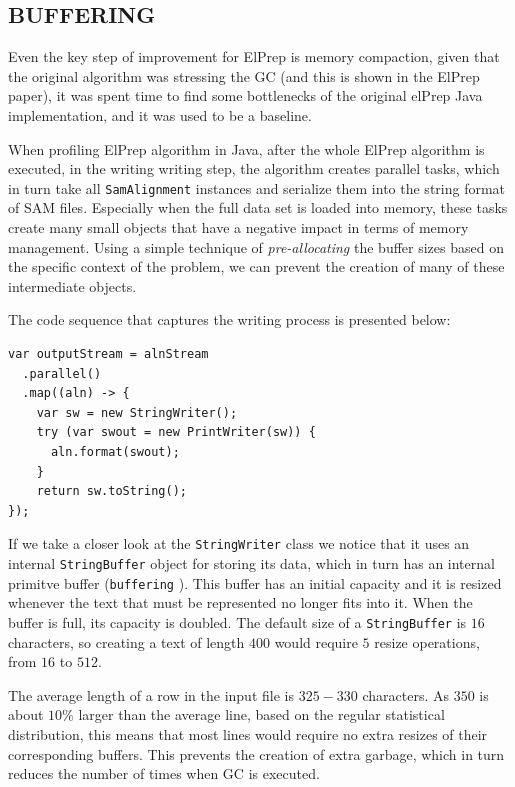 \documentclass[a4paper,twoside]{article}
\begin{document}
\subsection{\uppercase{Buffering}}
\label{subsec:buffering}

Even the key step of improvement for ElPrep is memory compaction, given that the original algorithm
was stressing the GC (and this is shown in the ElPrep paper), it was spent time to find some bottlenecks
of the original elPrep Java implementation, and it was used to be a baseline.

When profiling ElPrep algorithm in Java, after the whole ElPrep algorithm is executed, in the writing writing step, the algorithm creates parallel tasks, which in turn take all \texttt{SamAlignment} instances and serialize them into the string format of SAM files.
Especially when the full data set is loaded into memory, these tasks create many small objects that have a negative impact in terms of memory management. Using a simple technique of {\textit{pre-allocating} } the buffer sizes based on the specific context of the problem, we can prevent the creation of many of these intermediate objects.

The code sequence that captures the writing process is presented below:
\begin{verbatim}
var outputStream = alnStream
  .parallel()
  .map((aln) -> {
    var sw = new StringWriter();
    try (var swout = new PrintWriter(sw)) {
      aln.format(swout);
    }
    return sw.toString();
});
\end{verbatim}

If we take a closer look at the {\texttt{StringWriter}} class we notice that it uses an internal {\texttt{StringBuffer}} object for storing its data, which in turn has an internal primitve buffer  ({\texttt{buffering} } \cite{oaks:2014}).
This buffer has an initial capacity and it is resized whenever the text that must be represented no longer fits into it. When the buffer is full, its capacity is doubled. 
The default size of a \texttt{StringBuffer} is $16$ characters, so creating a text of length $400$ would require $5$ resize operations, from $16$ to $512$. 

The average length of a row in the input file is $325 - 330$ characters.
As $350$ is about $10\%$ larger than the average line, based on the regular statistical distribution, this means that most lines would require no extra resizes of their corresponding buffers. This prevents the creation of extra garbage, which in turn reduces the number of times when GC is executed.
\end{document}
